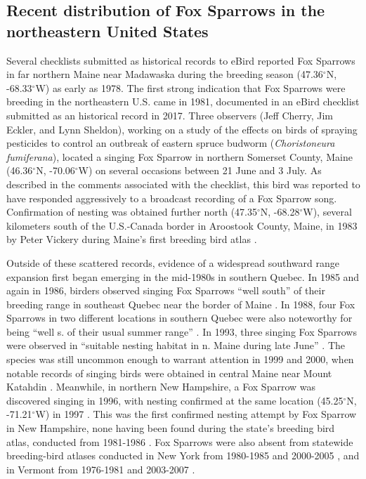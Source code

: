 \documentclass[fleqn,10pt,lineno]{wlpeerj} %
\begin{document}
\subsection*{Recent distribution of Fox Sparrows in the northeastern United States}
Several checklists submitted as historical records to eBird reported Fox Sparrows in far northern Maine near Madawaska during the breeding season (47.36$^{\circ}$N, -68.33$^{\circ}$W) as early as 1978. The first strong indication that Fox Sparrows were breeding in the northeastern U.S. came in 1981, documented in an eBird checklist submitted as an historical record in 2017. Three observers (Jeff Cherry, Jim Eckler, and Lynn Sheldon), working on a study of the effects on birds of spraying pesticides to control an outbreak of eastern spruce budworm (\textit{Choristoneura fumiferana}), located a singing Fox Sparrow in northern Somerset County, Maine (46.36$^{\circ}$N, -70.06$^{\circ}$W) on several occasions between 21 June and 3 July. As described in the comments associated with the checklist, this bird was reported to have responded aggressively to a broadcast recording of a Fox Sparrow song. Confirmation of nesting was obtained further north (47.35$^{\circ}$N, -68.28$^{\circ}$W), several kilometers south of the U.S.-Canada border in Aroostook County, Maine, in 1983 by Peter Vickery during Maine’s first breeding bird atlas \citep{Adamus1988-xw}. 

Outside of these scattered records, evidence of a widespread southward range expansion first began emerging in the mid-1980s in southern Quebec. In 1985 and again in 1986, birders observed singing Fox Sparrows “well south” of their breeding range in southeast Quebec near the border of Maine \citep{Yank1986-pj,Yank1985-pj}. In 1988, four Fox Sparrows in two different locations in southern Quebec were also noteworthy for being “well s. of their usual summer range” \citep{Gosselin1988-vk}. In 1993, three singing Fox Sparrows were observed in “suitable nesting habitat in n. Maine during late June” \citep{Petersen1993-kb}. The species was still uncommon enough to warrant attention in 1999 and 2000, when notable records of singing birds were obtained in central Maine near Mount Katahdin \citep{Petersen1999-kb}. Meanwhile, in northern New Hampshire, a Fox Sparrow was discovered singing in 1996, with nesting confirmed at the same location (45.25$^{\circ}$N, -71.21$^{\circ}$W) in 1997 \citep{Keith2013-gt}. This was the first confirmed nesting attempt by Fox Sparrow in New Hampshire, none having been found during the state’s breeding bird atlas, conducted from 1981-1986 \citep{Foss1994-nl}. Fox Sparrows were also absent from statewide breeding-bird atlases conducted in New York from 1980-1985 \citep{Andrle1988-jk} and 2000-2005 \citep{McGowan2008-em}, and in Vermont from 1976-1981 \citep{Laughlin1985-mn} and 2003-2007 \citep{Renfrew2013-kx}.
\end{document}
